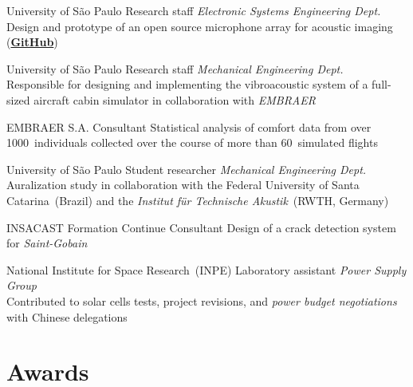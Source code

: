 \documentclass{cvlfoc}
\begin{document}
\begin{entrydate}
		{University of S\~{a}o Paulo}
		{Research staff}
		{\textit{Electronic Systems Engineering Dept.}
		\\
		Design and prototype of an open source microphone array for acoustic imaging\\ (\href{https://github.com/lfochamon/memsarray}{\textbf{GitHub}})}

		{University of S\~{a}o Paulo}
		{Research staff}
		{\textit{Mechanical Engineering Dept.}
		\\
		Responsible for designing and implementing the vibroacoustic system of a full-sized
		aircraft cabin simulator in collaboration with \emph{EMBRAER}}

		{EMBRAER S.A.}
		{Consultant}
		{Statistical analysis of comfort data from over 1000~individuals collected over the course of more than 60~simulated flights}

		{University of S\~{a}o Paulo}
		{Student researcher}
		{\textit{Mechanical Engineering Dept.}
		\\
		Auralization study in collaboration with the Federal University of Santa Catarina~(Brazil) and the \textit{Institut für Technische Akustik}~(RWTH, Germany)}

		{INSACAST Formation Continue}
		{Consultant}
		{Design of a crack detection system for \emph{Saint-Gobain}}

		{National Institute for Space Research~(INPE)}
		{Laboratory assistant}
		{\textit{Power Supply Group}
		\\
		Contributed to solar cells tests, project revisions, and \emph{power budget negotiations} with Chinese delegations}
\end{entrydate}



\section*{Awards}
\end{document}
